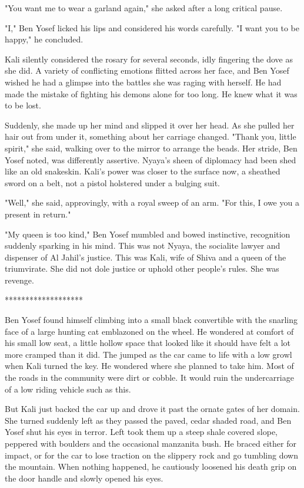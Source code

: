 \documentclass{amsart}
\begin{document}
"You want me to wear a garland again," she asked after a long critical pause.

"I," Ben Yosef licked his lips and considered his words carefully. "I want you to be happy," he concluded.

Kali silently considered the rosary for several seconds, idly fingering the dove as she did. A variety of conflicting emotions flitted across her face, and Ben Yosef wished he had a glimpse into the battles she was raging with herself. He had made the mistake of fighting his demons alone for too long. He knew what it was to be lost.

Suddenly, she made up her mind and slipped it over her head. As she pulled her hair out from under it, something about her carriage changed. "Thank you, little spirit," she said, walking over to the mirror to arrange the beads. Her stride, Ben Yosef noted, was differently assertive. Nyaya's sheen of diplomacy had been shed like an old snakeskin. Kali's power was closer to the surface now, a sheathed sword on a belt, not a pistol holstered under a bulging suit.

"Well," she said, approvingly, with a royal sweep of an arm. "For this, I owe you a present in return." 

"My queen is too kind," Ben Yosef mumbled and bowed instinctive, recognition suddenly sparking in his mind. This was not Nyaya, the socialite lawyer and dispenser of Al Jahil's justice. This was Kali, wife of Shiva and a queen of the triumvirate. She did not dole justice or uphold other people's rules. She was revenge.

\begin{center} ******************* \end{center} 

Ben Yosef found himself climbing into a small black convertible with the snarling face of a large hunting cat emblazoned on the wheel. He wondered at comfort of his small low seat, a little hollow space that looked like it should have felt a lot more cramped than it did. The jumped as the car came to life with a low growl when Kali turned the key. He wondered where she planned to take him. Most of the roads in the community were dirt or cobble. It would ruin the undercarriage of a low riding vehicle such as this. 

But Kali just backed the car up and drove it past the ornate gates of her domain. She turned suddenly left as they passed the paved, cedar shaded road, and Ben Yosef shut his eyes in terror. Left took them up a steep shale covered slope, peppered with boulders and the occasional manzanita bush. He braced either for impact, or for the car to lose traction on the slippery rock and go tumbling down the mountain. When nothing happened, he cautiously loosened his death grip on the door handle and slowly opened his eyes. 
\end{document}
